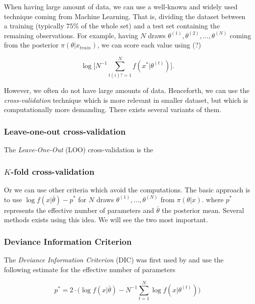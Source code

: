 When having large amount of data, we can use a well-known and widely used technique coming from Machine Learning. That is, dividing the dataset between a training (typically $75\%$ of the whole set) and a test set containing the remaining observations.
For example, having $N$ draws $\theta^{(1)},\theta^{(2)},\dots,\theta^{(N)}$ coming from the posterior $\pi(\theta|x_{train})$, we can score each value using (?)


\begin{equation}
\log\bigg[N^{-1}\sum_{t(i)?=1}^N f(x^*|\theta^{(t)})\bigg].
\end{equation}

However, we often do not have large amounts of data. Henceforth, we can use the \emph{cross-validation} technique which is more relevant in smaller dataset, but which is computationally more demanding. There exists several variants of them. 

\subsubsection*{Leave-one-out cross-validation}

The \emph{Leave-One-Out} (LOO) cross-validation is the 


\subsubsection*{$K$-fold cross-validation}

\citet{Vehtari_practical_2016}


Or we can use other criteria which avoid the computations. The basic approach is to use  $\log f(x|\bar{\theta})-p^*$ for $N$ draws $\theta^{(1)},\dots,\theta^{(N)}$ from $\pi(\theta|x)$. where $p^*$ represents the effective number of parameters and $\bar{\theta}$ the posterior mean. Several methods exists using this idea. We will see the two most important.

\subsubsection*{Deviance Information Criterion}

The \emph{Deviance Information Criterion}
(DIC) was first used by \citet{Spiegelhalter_bayesian_2002} and use the following estimate for the effective number of parameters 

\begin{equation}
p^*=2\cdot \bigg(\log f(x|\bar{\theta})-N^{-1}\sum_{t=1}^N\log f(x|\theta^{(t)})\bigg)
\end{equation}


